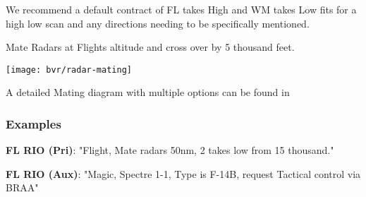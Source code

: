 We recommend a default contract of FL takes High and WM takes Low fits for a
high low scan and any directions needing to be specifically mentioned.

Mate Radars at Flights altitude and cross over by 5 thousand feet.

\texttt{[image: bvr/radar-mating]}

A detailed Mating diagram with multiple options can be found in

\subsubsection*{Examples}

\textbf{FL RIO (Pri)}: "Flight, Mate radars 50nm, 2 takes low from 15
thousand."

\textbf{FL RIO (Aux)}: "Magic, Spectre 1-1, Type is F-14B, request Tactical
control via BRAA"

